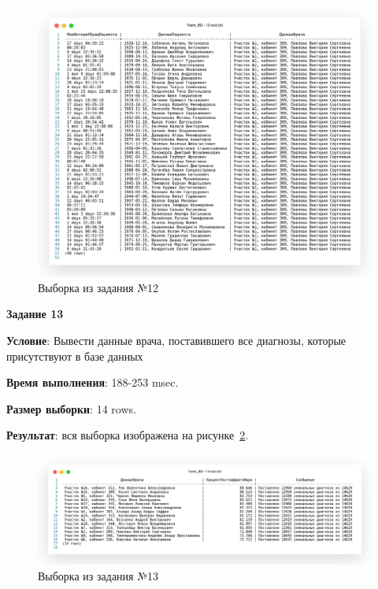 \begin{figure}[!h]
  \centering

  \includegraphics[width=18cm]
  {../sql/task12/12-out.png}

  \caption{Выборка из задания №12}

  \label{fig:t12}
\end{figure}


\newpage

\begin{center}
  \textbf{Задание 13}
\end{center}
  
\textbf{Условие}:
Вывести данные врача, поставившего все диагнозы, которые присутствуют в базе данных



\textbf{Время выполнения}: 188-253 msec.

\textbf{Размер выборки}: 14 rows.

\textbf{Результат}: вся выборка изображена на рисунке~\ref{fig:t13}.

\begin{figure}[!h]
  \centering

  \includegraphics[width=18cm]
  {../sql/task13/13-out.png}

  \caption{Выборка из задания №13}

  \label{fig:t13}
\end{figure}

